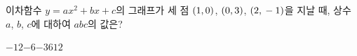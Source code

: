 \hspace*{2mm}\begin{minipage}[t]{\dimexpr\linewidth-2mm\relax}\vspace{0pt}
이차함수 $y=ax^2+bx+c$의 그래프가 세 점 $(1{,}\mkern3mu 0)$, $(0{,}\mkern3mu 3)$, $(2{,}\mkern3mu -1)$을 지날 때, 상수 $a$, $b$, $c$에 대하여 $abc$의 값은?
\begin{choices32}{$-12$}{$-6$}{$-3$}{$6$}{$12$}\end{choices32}\end{minipage}
